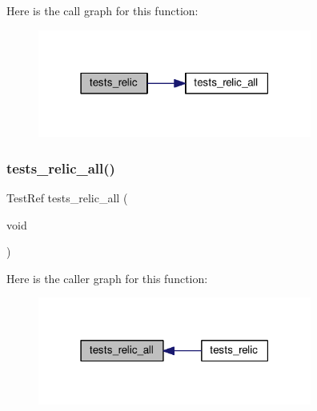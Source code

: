 Here is the call graph for this function\+:
\nopagebreak
\begin{figure}[H]
\begin{center}
\leavevmode
\includegraphics[width=255pt]{tests-relic_8c_a43bbbcfe05980402888d230537315cf3_cgraph}
\end{center}
\end{figure}
\mbox{\label{tests-relic_8c_ad3f0401881c5a3e820a7d174eeade913}} 
\subsubsection{\texorpdfstring{tests\+\_\+relic\+\_\+all()}{tests\_relic\_all()}}
{\footnotesize\ttfamily Test\+Ref tests\+\_\+relic\+\_\+all (\begin{DoxyParamCaption}\item[{void}]{ }\end{DoxyParamCaption})}

Here is the caller graph for this function\+:
\nopagebreak
\begin{figure}[H]
\begin{center}
\leavevmode
\includegraphics[width=255pt]{tests-relic_8c_ad3f0401881c5a3e820a7d174eeade913_icgraph}
\end{center}
\end{figure}
